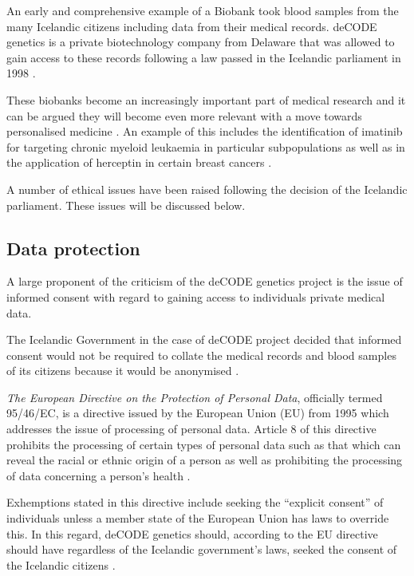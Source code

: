 \documentclass[british,a4paper, 12pt]{article}
\begin{document}
An early and comprehensive example of a Biobank took blood samples from the
many Icelandic citizens including data from their medical records. deCODE
genetics is a private biotechnology company from Delaware that was allowed to
gain access to these records following a law passed in the Icelandic parliament
in 1998 \parencite{chadwick1999icelandic}.

These biobanks become an increasingly important part of medical research and 
it can be argued they will become even more relevant with a move towards 
personalised medicine \parencite{watson2010integrating}. An example of this
includes the identification of imatinib for targeting chronic myeloid leukaemia 
in particular subpopulations \parencite{cohen2002approval} as well as in the
application of herceptin in certain breast cancers \parencite{lemieux2009role}.

A number of ethical issues have been raised 
following the decision of the Icelandic parliament. These issues will be 
discussed below.

\subsection{Data protection}
A large proponent of the criticism of the deCODE genetics project is the issue
of informed consent with regard to gaining access to individuals private
medical data.

The Icelandic Government in the case of deCODE project decided that informed 
consent would not be required to collate the medical records and blood samples 
of its citizens because it would be anonymised \parencite{chadwick1999icelandic}.

\emph{The European Directive on the Protection of Personal Data}, officially 
termed 95/46/EC, is a directive issued by the European Union (EU) from 1995 which 
addresses the issue of processing of personal data. Article 8 of this directive 
prohibits the processing of certain types of personal data such as that which 
can reveal the racial or ethnic origin of a person as well as prohibiting the 
processing of data concerning a person's health \parencite{directive199595}.

Exhemptions stated in this directive include seeking the ``explicit consent'' 
of individuals unless a member state of the European Union has laws to override 
this. In this regard, deCODE genetics should, according to the EU directive 
should have regardless of the Icelandic government's laws, seeked the consent of 
the Icelandic citizens \parencite{carey2009data}.
\end{document}

